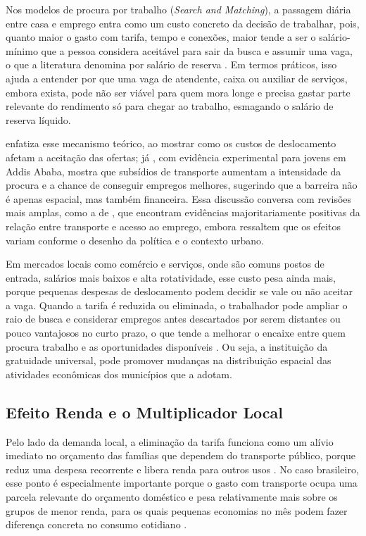 \documentclass[12pt, a4paper]{article}
\begin{document}
Nos modelos de procura por trabalho (\textit{Search and Matching}), a passagem diária entre casa e emprego entra como um custo concreto da decisão de trabalhar, pois, quanto maior o gasto com tarifa, tempo e conexões, maior tende a ser o salário-mínimo que a pessoa considera aceitável para sair da busca e assumir uma vaga, o que a literatura denomina por salário de reserva \citep{vandenberggorter2022, zenou2009}.
Em termos práticos, isso ajuda a entender por que uma vaga de atendente, caixa ou auxiliar de serviços, embora exista, pode não ser viável para quem mora longe e precisa gastar parte relevante do rendimento só para chegar ao trabalho, esmagando o salário de reserva líquido.

\citet{zenou2009} enfatiza esse mecanismo teórico, ao mostrar como os custos de deslocamento afetam a aceitação das ofertas; já \citet{Franklin2018}, com evidência experimental para jovens em Addis Ababa, mostra que subsídios de transporte aumentam a intensidade da procura e a chance de conseguir empregos melhores, sugerindo que a barreira não é apenas espacial, mas também financeira.
Essa discussão conversa com revisões mais amplas, como a de \citet{BastiaassemJohnsonLucas2020}, que encontram evidências majoritariamente positivas da relação entre transporte e acesso ao emprego, embora ressaltem que os efeitos variam conforme o desenho da política e o contexto urbano.

Em mercados locais como comércio e serviços, onde são comuns postos de entrada, salários mais baixos e alta rotatividade, esse custo pesa ainda mais, porque pequenas despesas de deslocamento podem decidir se vale ou não aceitar a vaga.
Quando a tarifa é reduzida ou eliminada, o trabalhador pode ampliar o raio de busca e considerar empregos antes descartados por serem distantes ou pouco vantajosos no curto prazo, o que tende a melhorar o encaixe entre quem procura trabalho e as oportunidades disponíveis \citep{gobilonselodzenou2007, Flemming2020}.
Ou seja, a instituição da gratuidade universal, pode promover mudanças na distribuição espacial das atividades econômicas dos municípios que a adotam.

\subsection{Efeito Renda e o Multiplicador Local}
Pelo lado da demanda local, a eliminação da tarifa funciona como um alívio imediato no orçamento das famílias que dependem do transporte público, porque reduz uma despesa recorrente e libera renda para outros usos \citep{proquebetarellijuniorribeiro2024, CrawleyTheloudis2024}.
No caso brasileiro, esse ponto é especialmente importante porque o gasto com transporte ocupa uma parcela relevante do orçamento doméstico e pesa relativamente mais sobre os grupos de menor renda, para os quais pequenas economias no mês podem fazer diferença concreta no consumo cotidiano \citep{ibge2020, proquebetarellijuniorribeiro2024}.
\end{document}
